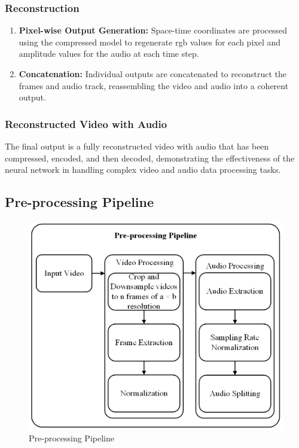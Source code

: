 \documentclass{ioereport}
\begin{document}
        \subsubsection{Reconstruction}
        \begin{enumerate}[label=\textbf{\roman*.}]
          \item \textbf{Pixel-wise Output Generation:} Space-time coordinates are processed using the compressed model to regenerate \gls{rgb} values for each pixel and amplitude values for the audio at each time step.
          \item \textbf{Concatenation:} Individual outputs are concatenated to reconstruct the frames and audio track, reassembling the video and audio into a coherent output.
        \end{enumerate}
        
        \subsubsection{Reconstructed Video with Audio}
        The final output is a fully reconstructed video with audio that has been compressed, encoded, and then decoded, demonstrating the effectiveness of the neural network in handling complex video and audio data processing tasks.
    
    \subsection{Pre-processing Pipeline}
    \begin{figure}[H]
        \centering
        \includegraphics[width=0.9\linewidth]{assets/Major Data Pre-Processing.png}
        \caption{Pre-processing Pipeline}
        \label{fig:pre-processing-pipeline}
    \end{figure}
    
\end{document}
